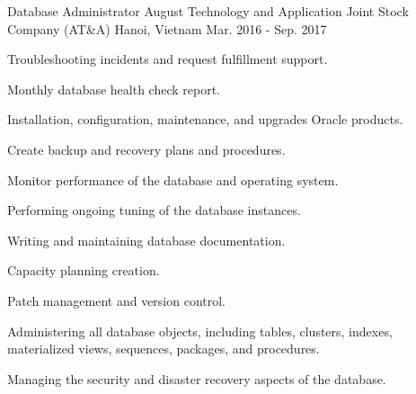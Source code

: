 \begin{cventries}
  \cventry
    {Database Administrator} %
    {August Technology and Application Joint Stock Company (AT\&A)} %
    {Hanoi, Vietnam} %
    {Mar. 2016 - Sep. 2017} %
    {
      \begin{cvitems} %
        \item {Troubleshooting incidents and request fulfillment support.}
        \item {Monthly database health check report.}
        \item {Installation, configuration, maintenance, and upgrades Oracle products.}
        \item {Create backup and recovery plans and procedures.}
        \item {Monitor performance of the database and operating system.}
        \item {Performing ongoing tuning of the database instances.}
        \item {Writing and maintaining database documentation.}
        \item {Capacity planning creation.}
        \item {Patch management and version control.}
        \item {Administering all database objects, including tables, clusters, indexes, materialized views, sequences, packages, and procedures.}
        \item {Managing the security and disaster recovery aspects of the database.}
      \end{cvitems}
    }

\end{cventries}
